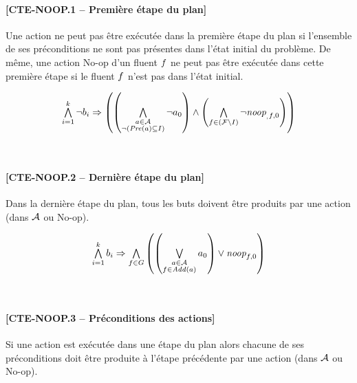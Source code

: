 \paragraph*{[CTE-NOOP.1 -- Première étape du plan]}

Une action ne peut pas être exécutée dans la première étape du plan si l'ensemble de ses préconditions ne sont pas présentes dans l'état initial du problème. De même, une action No-op d'un fluent $f$ ne peut pas être exécutée dans cette première étape si le fluent $f$ n'est pas dans l'état initial.

\begin{small}
\[
\begin{matrix}
\bigwedge\limits_{\substack{i=1}}^{k} \neg b_{i} \Rightarrow \left( \left(\bigwedge\limits_{\substack{\substack{a \in \mathcal{A}\\\neg \left(\mathit{Pre}(a)\subseteq I\right)}}} \neg a_{0} \right)
\wedge \left(\bigwedge\limits_{\substack{f\in \left(\mathcal{F}\setminus I\right)}}\neg \textit{noop}_{_,f,0}\right)\right)\\
\end{matrix}
\]
\end{small}\\

\paragraph*{[CTE-NOOP.2 -- Dernière étape du plan]}

Dans la dernière étape du plan, tous les buts doivent être produits par une action (dans $\mathcal{A}$ ou No-op).

\begin{small}
\[
\begin{matrix}
\bigwedge\limits_{\substack{i=1}}^{k} b_{i} \Rightarrow \bigwedge\limits_{\substack{f\in G}}\left(\left(\bigvee\limits_{\substack{\substack{a\in\mathcal{A}\\ f \in \mathit{Add}(a)}}} a_{0}\right) \vee \textit{noop}_{f,0}\right)
\end{matrix}
\]
\end{small}\\

\paragraph*{[CTE-NOOP.3 -- Préconditions des actions]}

Si une action est exécutée dans une étape du plan alors chacune de ses préconditions doit être produite à l'étape précédente par une action (dans $\mathcal{A}$ ou No-op).

